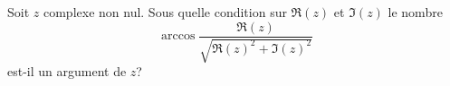 Soit $z$ complexe non nul. Sous quelle condition sur $\Re(z)$ et $\Im(z)$ le nombre 
\begin{displaymath}
 \arccos \frac{\Re(z)}{\sqrt{\Re(z)^2+\Im(z)^2}} 
\end{displaymath}
est-il un argument de $z$?
\bigskip
